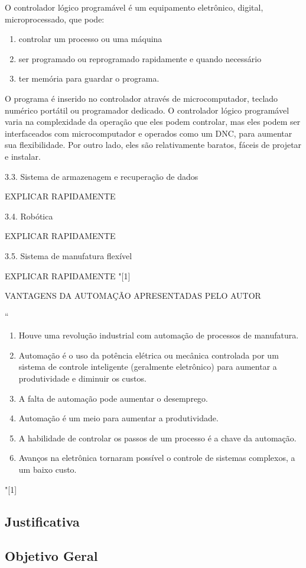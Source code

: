 \documentclass[a4paper, 12pt]{article}
\begin{document}
O controlador lógico programável é um equipamento eletrônico, digital, 
microprocessado, que pode:
\begin{enumerate}
	\item controlar um processo ou uma máquina
	\item ser programado ou reprogramado rapidamente e quando necessário
	\item ter memória para guardar o programa.
\end{enumerate}
O programa é inserido no controlador através de microcomputador, teclado
numérico portátil ou programador dedicado. O controlador lógico programável
varia na complexidade da operação que eles podem controlar, mas eles podem ser
interfaceados com microcomputador e operados como um DNC, para aumentar
sua flexibilidade. Por outro lado, eles são relativamente baratos, fáceis 
de projetar e instalar.

3.3. Sistema de armazenagem e
recuperação de dados

EXPLICAR RAPIDAMENTE

3.4. Robótica

EXPLICAR RAPIDAMENTE

3.5. Sistema de manufatura flexível

EXPLICAR RAPIDAMENTE
"[1]

VANTAGENS DA AUTOMAÇÃO APRESENTADAS PELO AUTOR

``
\begin{enumerate}
	\item Houve uma revolução industrial com automação de processos de manufatura.
	\item Automação é o uso da potência elétrica ou mecânica controlada por um
				sistema de controle inteligente (geralmente eletrônico) para aumentar
				a produtividade e diminuir os custos.
	\item A falta de automação pode aumentar o desemprego.
	\item Automação é um meio para aumentar a produtividade.
	\item A habilidade de controlar os passos de um processo é a chave da automação.
	\item Avanços na eletrônica tornaram possível o controle de sistemas complexos,
				a um baixo custo.
\end{enumerate} 
"[1]

\subsection{Justificativa}
\subsection{Objetivo Geral}
\end{document}

